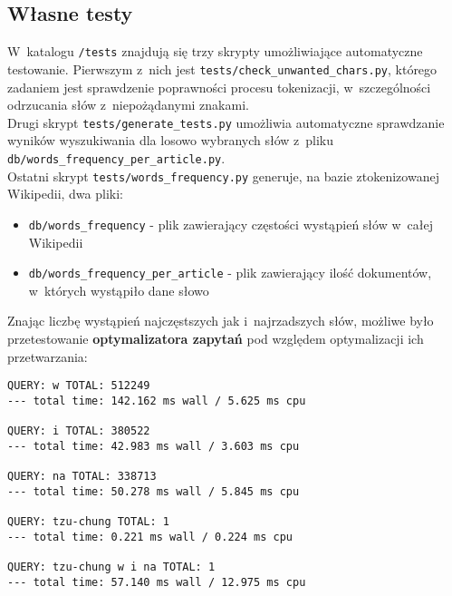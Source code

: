 \documentclass[a4paper,12pt]{article}
\begin{document}
\subsection{Własne testy}
W~katalogu \texttt{/tests} znajdują się trzy skrypty umożliwiające automatyczne
testowanie. Pierwszym z~nich jest \texttt{tests/check\_unwanted\_chars.py}, którego
zadaniem jest sprawdzenie poprawności procesu tokenizacji, w~szczególności
odrzucania słów z~niepożądanymi znakami.\\
Drugi skrypt \texttt{tests/generate\_tests.py} umożliwia automatyczne
sprawdzanie wyników wyszukiwania dla losowo wybranych słów z~pliku\\
\texttt{db/words\_frequency\_per\_article.py}.\\
Ostatni skrypt \texttt{tests/words\_frequency.py} generuje, na bazie
ztokenizowanej Wikipedii, dwa pliki:
\begin{itemize}
	\item \texttt{db/words\_frequency} - plik zawierający częstości wystąpień
		słów w~całej Wikipedii
	\item \texttt{db/words\_frequency\_per\_article} - plik zawierający ilość
		dokumentów, w~których wystąpiło dane słowo
\end{itemize}
Znając liczbę wystąpień najczęstszych jak i~najrzadszych słów, możliwe było
przetestowanie \textbf{optymalizatora zapytań} pod względem optymalizacji ich
przetwarzania:
\begin{verbatim}
QUERY: w TOTAL: 512249
--- total time: 142.162 ms wall / 5.625 ms cpu

QUERY: i TOTAL: 380522
--- total time: 42.983 ms wall / 3.603 ms cpu

QUERY: na TOTAL: 338713
--- total time: 50.278 ms wall / 5.845 ms cpu

QUERY: tzu-chung TOTAL: 1
--- total time: 0.221 ms wall / 0.224 ms cpu

QUERY: tzu-chung w i na TOTAL: 1
--- total time: 57.140 ms wall / 12.975 ms cpu
\end{verbatim}
\end{document}
